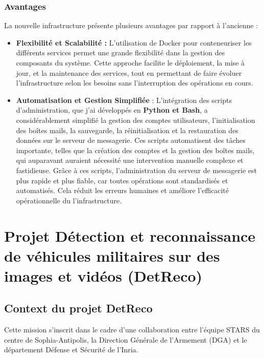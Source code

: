 \subsubsection{Avantages}

La nouvelle infrastructure présente plusieurs avantages par rapport à l'ancienne :

\begin{itemize}
	\item \textbf{Flexibilité et Scalabilité :} L'utilisation de Docker pour conteneuriser les différents services permet une grande flexibilité dans la gestion des composants du système.
	      Cette approche facilite le déploiement, la mise à jour, et la maintenance des services, tout en permettant de faire évoluer l'infrastructure selon les besoins sans l'interruption des opérations en cours.
	\item \textbf{Automatisation et Gestion Simplifiée} : L'intégration des scripts d'administration, que j'ai développés en \textbf{Python et Bash}, a considérablement simplifié la gestion des comptes utilisateurs, l'initialisation des boîtes mails, la sauvegarde, la réinitialisation et la restauration des données sur le serveur de messagerie.
	      Ces scripts automatisent des tâches importante, telles que la création des comptes et la gestion des boîtes mails, qui auparavant auraient nécessité une intervention manuelle complexe et fastidieuse.
	      Grâce à ces scripts, l'administration du serveur de messagerie est plus rapide et plus fiable, car toutes opérations sont standardisés et automatisés.
	      Cela réduit les erreurs humaines et améliore l'efficacité opérationnelle du l'infrastructure.
\end{itemize}




\section{Projet Détection et reconnaissance de véhicules militaires sur des images et vidéos (DetReco)}

\subsection{Context du projet DetReco}

Cette mission s’inscrit dans le cadre d’une collaboration entre l’équipe STARS du centre de Sophia-Antipolis, la Direction Générale de l’Armement (DGA) et le département Défense et Sécurité de l’Inria.


